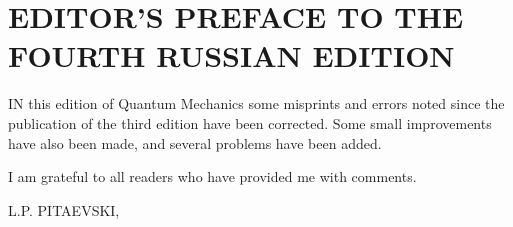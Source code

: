 \chapter{EDITOR’S PREFACE TO THE FOURTH RUSSIAN EDITION}
IN this edition of Quantum Mechanics some misprints and errors noted since the publication of the third edition have been corrected. Some small improvements have also been made, and several problems have been added.

I am grateful to all readers who have provided me with comments.


\vspace{4ex}
\noindent L.P. PITAEVSKI, \date{May 1988}
